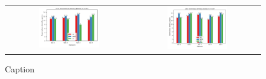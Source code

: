 \begin{figure}
    \centering
    \begin{tabular}{cc}
        \includegraphics[width = 0.5\textwidth]{plots/exp1/tlys_2_P6122/peaks/3p0_zn_2Dbar.png} & \includegraphics[width = 0.5\textwidth]{plots/exp1/tlys_2_P6122/peaks/3p5_zn_2Dbar.png}
    \end{tabular}
    \caption{Caption}
    \label{fig:tlys2_zn_peaks}
\end{figure}